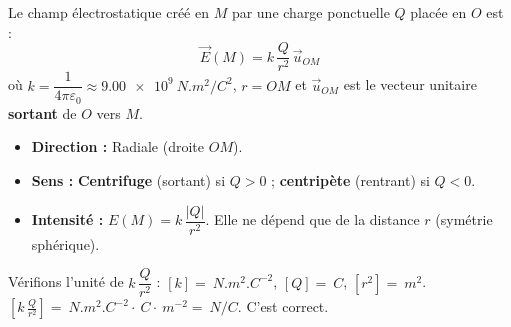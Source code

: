 \documentclass[11pt]{article}
\begin{document}
\begin{propriete}
Le champ électrostatique créé en $M$ par une charge ponctuelle $Q$ placée en $O$ est :
\[
\boxed{\vec{E}(M) = k\,\frac{Q}{r^2}\,\vec{u}_{OM}}
\]
où $k = \dfrac{1}{4\pi\varepsilon_0} \approx \SI{9,00e9}{N.m^2/C^2}$, $r = OM$ et $\vec{u}_{OM}$ est le vecteur unitaire \textbf{sortant} de $O$ vers $M$.
\begin{itemize}
    \item \textbf{Direction :} Radiale (droite $OM$).
    \item \textbf{Sens :} \textbf{Centrifuge} (sortant) si $Q > 0$ ; \textbf{centripète} (rentrant) si $Q < 0$.
    \item \textbf{Intensité :} $E(M) = k\,\dfrac{|Q|}{r^2}$. Elle ne dépend que de la distance $r$ (symétrie sphérique).
\end{itemize}
\end{propriete}

\begin{aretenir}
Vérifions l'unité de $k\,\dfrac{Q}{r^2}$ :
$[k] = \SI{}{N.m^2.C^{-2}}$, $[Q] = \SI{}{C}$, $[r^2] = \SI{}{m^2}$.
$\left[k\,\frac{Q}{r^2}\right] = \SI{}{N.m^2.C^{-2}} \cdot \SI{}{C} \cdot \SI{}{m^{-2}} = \SI{}{N/C}$. C'est correct.
\end{aretenir}
\end{document}
